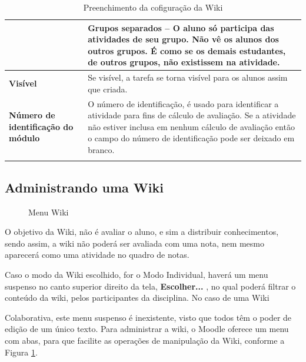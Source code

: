 \begin{longtable}{p{6cm}|p{9cm}}
&\textbf{Grupos separados} – O aluno só participa das atividades de seu grupo. Não vê os alunos dos outros grupos. É como se os demais estudantes, de outros grupos, não existissem na atividade.
\\\hline
    \textbf{Visível} & Se visível, a tarefa se torna visível para os alunos assim que criada. \\\hline
    \textbf{Número de identificação do módulo} & O número de identificação,  é usado para identificar a atividade para fins de cálculo de avaliação. Se a atividade não estiver inclusa em nenhum cálculo de avaliação então o campo do número de identificação pode ser deixado em branco.  \\\hline
\caption{Preenchimento da cofiguração da Wiki}
\end{longtable}%

\subsection{Administrando uma Wiki}
\begin{figure}[!htbp]
 \begin{center}
\caption{Menu Wiki}
  \label{fig:cap5_44}
 \end{center}
\end{figure}

O objetivo da Wiki, não é avaliar o aluno, e sim a distribuir conhecimentos, sendo assim, a wiki não poderá ser avaliada com uma nota, nem mesmo aparecerá como uma atividade no quadro de notas.

Caso o modo da Wiki escolhido, for o Modo Individual, haverá um menu suspenso no canto superior direito da tela, \textbf{Escolher...} , no qual poderá filtrar o conteúdo da wiki, pelos participantes da disciplina. No caso de uma Wiki

Colaborativa, este menu suspenso é inexistente, visto que todos têm o poder de edição de um único texto.
Para administrar a wiki, o Moodle oferece um menu com abas, para que facilite as operações de manipulação da Wiki, conforme a Figura \ref{fig:cap5_44}.


